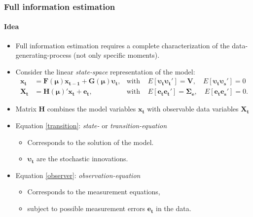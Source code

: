 \documentclass{beamer} %
\begin{document}
\begin{frame}\frametitle{Full information estimation}\framesubtitle{Idea}
    \begin{itemize}
      \item Full information estimation requires a complete characterization of the data-generating-process (not only specific moments).
      \item Consider the linear \emph{state-space} representation of the model:
        \begin{align}
        \mathbf{x_t} &= \mathbf{F}(\boldsymbol{\mu}) \mathbf{x_{t-1}} + \mathbf{G}(\boldsymbol{\mu}) \boldsymbol{\upsilon_{t}},  &\text{with }&E[\boldsymbol{\upsilon_t} \boldsymbol{\upsilon_t}']=\mathbf{V},\quad E[\boldsymbol{\upsilon_t} \boldsymbol{\upsilon_s}']=0 \label{transition}\\
        \mathbf{X_t} &= \mathbf{H}(\boldsymbol{\mu})' \mathbf{x_t }+ \mathbf{e_t},& \text{with }& E[\mathbf{e_t} \mathbf{e_t}']= \boldsymbol{\Sigma_e}, \quad E[\mathbf{e_t} \mathbf{e_s}']=0. \label{observer}
        \end{align}
    \item Matrix $\mathbf{H}$ combines the model variables $\mathbf{x_t}$ with observable data variables $\mathbf{X_t}$
    \item Equation \eqref{transition}: \emph{state-} or \emph{transition-equation}
    \begin{itemize}
      \item Corresponds to the solution of the model.
      \item $\boldsymbol{\upsilon_t}$ are the stochastic innovations.
    \end{itemize}
    \item Equation \eqref{observer}: \emph{observation-equation}
    \begin{itemize}
      \item Corresponds to the measurement equations,
      \item subject to possible measurement errors $\mathbf{e_t}$ in the data.
    \end{itemize}
    \end{itemize}
\end{frame}
\end{document}
